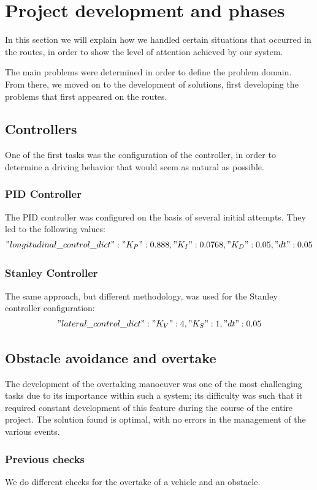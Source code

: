 \documentclass{article}
\begin{document}
\section{Project development and phases }
In this section we will explain how we handled certain situations that occurred in the routes, 
in order to show the level of attention achieved by our system.

The main problems were determined in order to define the problem domain. 
From there, we moved on to the development of solutions, first developing the problems that first appeared on the routes.
\subsection{Controllers}
One of the first tasks was the configuration of the controller, in order to determine a driving behavior that 
would seem as natural as possible. 
\subsubsection{PID Controller}
The PID controller was configured on the basis of several initial attempts. They led to the following values:
$$"longitudinal\_control\_dict" : {"K_P": 0.888 , "K_I": 0.0768, "K_D": 0.05, "dt": 0.05}$$

\subsubsection{Stanley Controller}
The same approach, but different methodology, was used for the Stanley controller configuration:
$$"lateral\_control\_dict" : {"K_V": 4, "K_S": 1, "dt": 0.05}$$

\subsection{Obstacle avoidance and overtake}
The development of the overtaking manoeuver was one of the most challenging tasks due to its importance 
within such a system; its difficulty was such that it required constant development of this feature during 
the course of the entire project. The solution found is optimal, with no errors in the management of the 
various events.

\subsubsection*{Previous checks}
We do different checks for the overtake of a vehicle and an obstacle.
\end{document}
